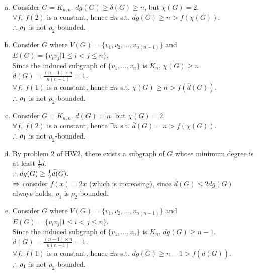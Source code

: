 \setcounter{pr}{4}
\begin{pr}$ $
\begin{enumerate}[(a)]
\item Consider $G=K_{n, n}$. $dg(G)\geq\delta(G)\geq n$, but $\chi(G)=2$.\\
$\forall f,\ f(2)$ is a constant, hence $\exists n$ s.t. $dg(G)\geq n>f(\chi(G))$.\\
$\therefore\rho_1$ is not $\rho_2$-bounded.
\item Consider $G$ where $V(G)=\{v_1, v_2, \dots, v_{n(n-1)}\}$ and $E(G)=\{v_iv_j|1\leq i<j\leq n\}$.\\
Since the induced subgraph of $\{v_1, \dots, v_n\}$ is $K_n$, $\chi(G)\geq n$.\\
$\bar d(G)=\frac{(n-1)\times n}{n(n-1)}=1$.\\
$\forall f,\ f(1)$ is a constant, hence $\exists n$ s.t. $\chi(G)\geq n>f(\bar d(G))$.\\
$\therefore\rho_1$ is not $\rho_2$-bounded.
\item Consider $G=K_{n, n}$. $\bar d(G)=n$, but $\chi(G)=2$.\\
$\forall f,\ f(2)$ is a constant, hence $\exists n$ s.t. $\bar d(G)=n>f(\chi(G))$.\\
$\therefore\rho_1$ is not $\rho_2$-bounded.
\item By problem 2 of HW2, there exists a subgraph of $G$ whose minimum degree is at least $\frac12\bar d$.\\
$\therefore dg(G)\geq\frac12\bar d(G)$.\\
$\Rightarrow$ consider $f(x)=2x$ (which is increasing), since $\bar d(G)\leq2dg(G)$ always holds, $\rho_1$ is $\rho_2$-bounded.
\item Consider $G$ where $V(G)=\{v_1, v_2, \dots, v_{n(n-1)}\}$ and $E(G)=\{v_iv_j|1\leq i<j\leq n\}$.\\
Since the induced subgraph of $\{v_1, \dots, v_n\}$ is $K_n$, $dg(G)\geq n-1$.\\
$\bar d(G)=\frac{(n-1)\times n}{n(n-1)}=1$.\\
$\forall f,\ f(1)$ is a constant, hence $\exists n$ s.t. $dg(G)\geq n-1>f(\bar d(G))$.\\
$\therefore\rho_1$ is not $\rho_2$-bounded.
\end{enumerate}
\end{pr}
